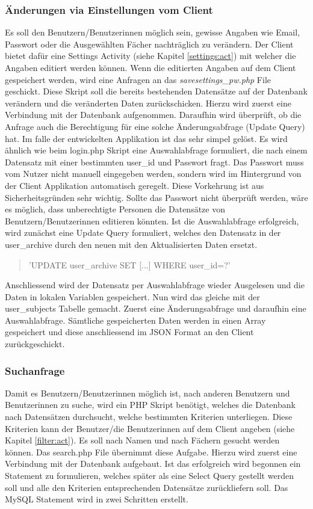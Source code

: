 \documentclass[a4paper,11pt]{report}
\begin{document}
					\subsubsection{Änderungen via Einstellungen vom Client}
					Es soll den Benutzern/Benutzerinnen möglich sein, gewisse Angaben wie Email, Passwort oder die Ausgewählten Fächer nachträglich zu verändern. Der Client bietet dafür eine Settings Activity (siehe Kapitel \ref{settings:act}) mit welcher die Angaben editiert werden können. Wenn die editierten Angaben auf dem Client gespeichert werden, wird eine Anfragen an das \emph{savesettings\_pw.php} File geschickt. Diese Skript soll die bereits bestehenden Datensätze auf der Datenbank verändern und die veränderten Daten zurückschicken. Hierzu wird zuerst eine Verbindung mit der Datenbank aufgenommen. Daraufhin wird überprüft, ob die Anfrage auch die Berechtigung für eine solche Änderungsabfrage (Update Query) hat. Im falle der entwickelten Applikation ist das sehr simpel gelöst. Es wird ähnlich wie beim login.php Skript eine Auswahlabfrage formuliert, die nach einem Datensatz mit einer bestimmten user\_id und Passwort fragt. Das Passwort muss vom Nutzer nicht manuell eingegeben werden, sondern wird im Hintergrund von der Client Applikation automatisch geregelt. Diese Vorkehrung ist aus Sicherheitsgründen sehr wichtig. Sollte das Passwort nicht überprüft werden, wäre es möglich, dass unberechtigte Personen die Datensätze von Benutzern/Benutzerinnen editieren könnten. Ist die Auswahlabfrage erfolgreich, wird zunächst eine Update Query formuliert, welches den Datensatz in der user\_archive durch den neuen mit den Aktualisierten Daten ersetzt.
					\begin{quotation}
						{\selectfont\noindent 'UPDATE user\_archive SET [...] WHERE user\_id=?'}
					\end{quotation}
					
					Anschliessend wird der Datensatz per Auswahlabfrage wieder Ausgelesen und die Daten in lokalen Variablen gespeichert. Nun wird das gleiche mit der user\_subjects Tabelle gemacht. Zuerst eine Änderungsabfrage und daraufhin eine Auswahlabfrage. Sämtliche gespeicherten Daten werden in einen Array gespeichert und diese anschliessend im JSON Format an den Client zurückgeschickt.
					\subsubsection{Suchanfrage} \label{sssec:Suchanfrage}
					Damit es Benutzern/Benutzerinnen möglich ist, nach anderen Benutzern und Benutzerinnen zu suche, wird ein PHP Skript benötigt, welches die Datenbank nach Datensätzen durchsucht, welche bestimmten Kriterien unterliegen. Diese Kriterien kann der Benutzer/die Benutzerinnen auf dem Client angeben (siehe Kapitel \ref{filter:act}). Es soll nach Namen und nach Fächern gesucht werden können. Das search.php File übernimmt diese Aufgabe. Hierzu wird zuerst eine Verbindung mit der Datenbank aufgebaut. Ist das erfolgreich wird begonnen ein Statement zu formulieren, welches später als eine Select Query gestellt werden soll und alle den Kriterien entsprechenden Datensätze zurückliefern soll. Das MySQL Statement wird in zwei Schritten erstellt.
					
\end{document}
